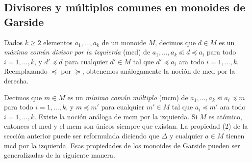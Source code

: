 \documentclass[12pt]{book}
\theoremstyle{definition}
\begin{document}
\subsection{Divisores y múltiplos comunes en monoides de Garside}

Dados $k\geq 2$ elementos $a_1,\ldots,a_k$ de un monoide $M$, decimos que $d\in M$ es un \textit{máximo común divisor por la izquierda} (mcd) de $a_1,\ldots,a_k$ si $d\preceq a_i$ para todo $i=1,\ldots,k$, y $d'\preceq d$ para cualquier $d'\in M$ tal que $d'\preceq a_i$ ara todo $i=1,\ldots,k$. Reemplazando $\preceq$ por $\succeq$, obtenemos análogamente la noción de mcd por la derecha.

Decimos que $m\in M$ es un \textit{mínimo común múltiplo} (mcm) de $a_1,\ldots,a_k$ si $a_i\preceq m$ para todo $i=1,\ldots,k$, y $m\preceq m'$ para cualquier $m'\in M$ tal que $a_i\preceq m'$ ara todo $i=1,\ldots,k$. Existe la noción análoga de mcm por la izquierda. Si $M$ es atómico, entonces el mcd y el mcm son únicos siempre que existan. La propiedad (2) de la sección anterior puede ser reformulada diciendo que $\Delta$ y cualquier $a\in M$ tienen mcd por la izquierda. Esas propiedades de los monoides de Garside pueden ser generalizadas de la siguiente manera.
\end{document}
